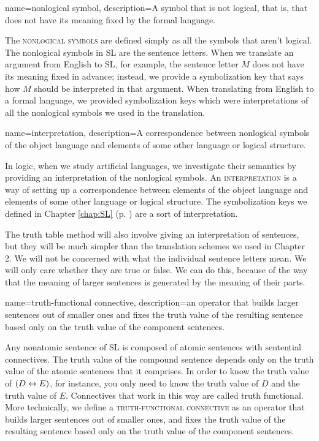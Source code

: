 {
name=nonlogical symbol,
description={A symbol that is not logical, that is, that does not have its meaning fixed by the formal language.}
}

The \textsc{\glspl{nonlogical symbol}} \label{def:nonlogical_symbol}
 are defined simply as all the symbols that aren't logical. The nonlogical symbols in SL are the sentence letters. When we translate an argument from English to SL, for example, the sentence letter $M$ does not have its meaning fixed in advance; instead, we provide a symbolization key that says how $M$ should be interpreted in that argument. When translating from English to a formal language, we provided symbolization keys which were interpretations of all the nonlogical symbols we used in the translation. 

{
name=interpretation,
description={A correspondence between nonlogical symbols of the object language and elements of some other language or logical structure.}
}

In logic, when we study artificial languages, we investigate their semantics by providing an interpretation of the nonlogical symbols. An \textsc{\gls{interpretation}} \label{def:interpretation} is a way of setting up a correspondence between elements of the object language and elements of some other language or logical structure. The symbolization keys we defined in Chapter \ref{chap:SL} (p. \pageref{def:symbolization_key}) are a sort of interpretation. 

The truth table method will also involve giving an interpretation of sentences, but they will be much simpler than the translation schemes we used in Chapter 2. We will not be concerned with what the individual sentence letters mean. We will only care whether they are true or false. We can do this, because of the way that the meaning of larger sentences is generated by the meaning of their parts.


{
name=truth-functional connective,
description={an operator that builds larger sentences out of smaller ones and fixes the truth value of the resulting sentence based only on the truth value of the component sentences.}
}

Any nonatomic sentence of SL is composed of atomic sentences with sentential connectives. The truth value of the compound sentence depends only on the truth value of the atomic sentences that it comprises. In order to know the truth value of $(D\leftrightarrow E)$, for instance, you only need to know the truth value of $D$ and the truth value of $E$. Connectives that work in this way are called truth functional. More technically, we define a \textsc{\gls{truth-functional connective}} \label{def:truth-functional_connective}as an operator that builds larger sentences out of smaller ones, and fixes the truth value of the resulting sentence based only on the truth value of the component sentences. 

